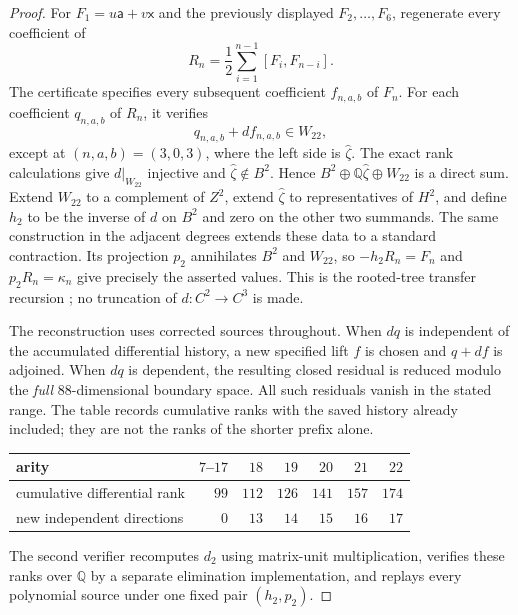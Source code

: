 \documentclass[11pt]{amsart}
\newcommand{\Q}{\mathbb Q}
\begin{document}
\begin{proof}
For $F_1=u\mathsf a+v\mathsf x$ and the previously displayed $F_2,\ldots,F_6$,
regenerate every coefficient of
\[
R_n=\frac12\sum_{i=1}^{n-1}[F_i,F_{n-i}].
\]
The certificate specifies every subsequent coefficient $f_{n,a,b}$ of $F_n$.
For each coefficient $q_{n,a,b}$ of $R_n$, it verifies
\[
q_{n,a,b}+d f_{n,a,b}\in W_{22},
\]
except at $(n,a,b)=(3,0,3)$, where the left side is $\widehat\zeta$.
The exact rank calculations give $d|_{W_{22}}$ injective and
$\widehat\zeta\notin B^2$. Hence
$B^2\oplus\Q\widehat\zeta\oplus W_{22}$ is a direct sum.
Extend $W_{22}$ to a complement of $Z^2$, extend $\widehat\zeta$ to
representatives of $H^2$, and define $h_2$ to be the inverse of $d$ on $B^2$
and zero on the other two summands. The same construction in the adjacent
degrees extends these data to a standard contraction. Its projection $p_2$
annihilates $B^2$ and $W_{22}$, so
$-h_2 R_n=F_n$ and $p_2 R_n=\kappa_n$ give precisely the asserted values.
This is the rooted-tree transfer recursion
\cite[Chapter~10]{LodayVallette2012}; no truncation of $d:C^2\to C^3$ is made.

The reconstruction uses corrected sources throughout. When $dq$ is independent
of the accumulated differential history, a new specified lift $f$ is chosen
and $q+df$ is adjoined. When $dq$ is dependent, the resulting closed residual is
reduced modulo the \emph{full} $88$-dimensional boundary space. All such residuals
vanish in the stated range. The table records cumulative ranks with the saved
history already included; they are not the ranks of the shorter prefix alone.
\begin{center}
\begin{tabular}{@{}lrrrrrr@{}}
\toprule
arity & $7$--$17$ & $18$ & $19$ & $20$ & $21$ & $22$\\
\midrule
cumulative differential rank & $99$ & $112$ & $126$ & $141$ & $157$ & $174$\\
new independent directions & $0$ & $13$ & $14$ & $15$ & $16$ & $17$\\
\bottomrule
\end{tabular}
\end{center}
The second verifier recomputes $d_2$ using matrix-unit multiplication, verifies
these ranks over $\Q$ by a separate elimination implementation, and replays
every polynomial source under one fixed pair $(h_2,p_2)$.
\end{proof}
\end{document}
